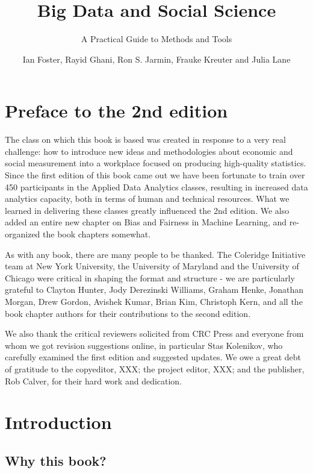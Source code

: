 \documentclass[]{krantz}
\title{Big Data and Social Science}
\subtitle{A Practical Guide to Methods and Tools}
\author{Ian Foster, Rayid Ghani, Ron S. Jarmin, Frauke Kreuter and Julia Lane}
\date{}
\begin{document}
\maketitle

{
\setcounter{tocdepth}{1}
\tableofcontents
}
\listoftables
\listoffigures
\chapter*{Preface to the 2nd edition}\label{preface-to-the-2nd-edition}

The class on which this book is based was created in response to a very
real challenge: how to introduce new ideas and methodologies about
economic and social measurement into a workplace focused on producing
high-quality statistics. Since the first edition of this book came out
we have been fortunate to train over 450 participants in the Applied
Data Analytics classes, resulting in increased data analytics capacity,
both in terms of human and technical resources. What we learned in
delivering these classes greatly influenced the 2nd edition. We also
added an entire new chapter on Bias and Fairness in Machine Learning,
and re-organized the book chapters somewhat.

As with any book, there are many people to be thanked. The Coleridge
Initiative team at New York University, the University of Maryland and
the University of Chicago were critical in shaping the format and
structure - we are particularly grateful to Clayton Hunter, Jody
Derezinski Williams, Graham Henke, Jonathan Morgan, Drew Gordon, Avishek
Kumar, Brian Kim, Christoph Kern, and all the book chapter authors for
their contributions to the second edition.

We also thank the critical reviewers solicited from CRC Press and
everyone from whom we got revision suggestions online, in particular
Stas Kolenikov, who carefully examined the first edition and suggested
updates. We owe a great debt of gratitude to the copyeditor, XXX; the
project editor, XXX; and the publisher, Rob Calver, for their hard work
and dedication.

\hypertarget{chap:intro}{\chapter{Introduction}\label{chap:intro}}

\section{Why this book?}\label{sec:1-1}
\end{document}
